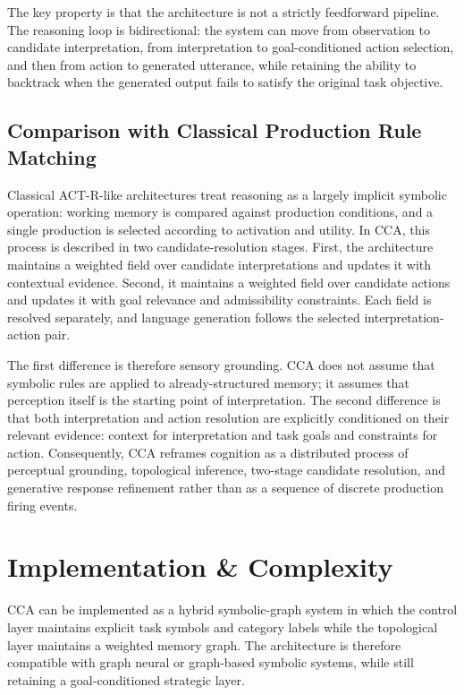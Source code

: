 \documentclass[10pt,journal,compsoc]{IEEEtran}
\begin{document}
The key property is that the architecture is not a strictly feedforward pipeline. The reasoning loop is bidirectional: the system can move from observation to candidate interpretation, from interpretation to goal-conditioned action selection, and then from action to generated utterance, while retaining the ability to backtrack when the generated output fails to satisfy the original task objective.

\subsection{Comparison with Classical Production Rule Matching}

Classical ACT-R-like architectures treat reasoning as a largely implicit symbolic operation: working memory is compared against production conditions, and a single production is selected according to activation and utility. In CCA, this process is described in two candidate-resolution stages. First, the architecture maintains a weighted field over candidate interpretations and updates it with contextual evidence. Second, it maintains a weighted field over candidate actions and updates it with goal relevance and admissibility constraints. Each field is resolved separately, and language generation follows the selected interpretation-action pair.

The first difference is therefore sensory grounding. CCA does not assume that symbolic rules are applied to already-structured memory; it assumes that perception itself is the starting point of interpretation. The second difference is that both interpretation and action resolution are explicitly conditioned on their relevant evidence: context for interpretation and task goals and constraints for action. Consequently, CCA reframes cognition as a distributed process of perceptual grounding, topological inference, two-stage candidate resolution, and generative response refinement rather than as a sequence of discrete production firing events.

\section{Implementation \& Complexity}

CCA can be implemented as a hybrid symbolic-graph system in which the control layer maintains explicit task symbols and category labels while the topological layer maintains a weighted memory graph. The architecture is therefore compatible with graph neural or graph-based symbolic systems, while still retaining a goal-conditioned strategic layer.
\end{document}
